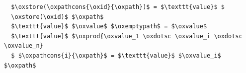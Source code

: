\begin{lstlisting}
  $\oxstore(\oxpathcons{\oxid}{\oxpath})$ = $\texttt{value}$ $
  \oxstore(\oxid)$ $\oxpath$
  $\texttt{value}$ $\oxvalue$ $\oxemptypath$ = $\oxvalue$
  $\texttt{value}$ $\oxprod{\oxvalue_1 \oxdotsc \oxvalue_i \oxdotsc \oxvalue_n}
  $ $\oxpathcons{i}{\oxpath}$ = $\texttt{value}$ $\oxvalue_i$ $\oxpath$
\end{lstlisting}